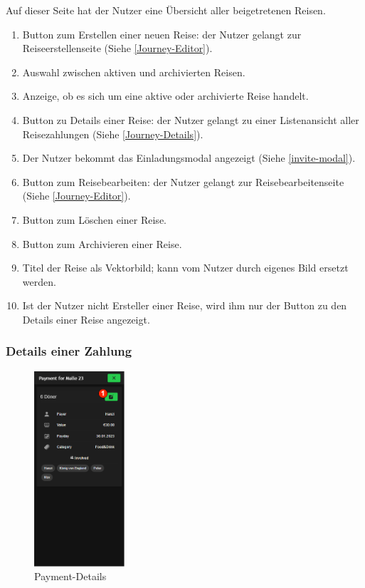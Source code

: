 Auf dieser Seite hat der Nutzer eine Übersicht aller beigetretenen Reisen.

\begin{enumerate}[label=\protect\circled{\arabic*}]
	\item Button zum Erstellen einer neuen Reise: der Nutzer gelangt zur Reiseerstellenseite  (Siehe \ref{Journey-Editor}).
	\item Auswahl zwischen aktiven und archivierten Reisen.
	\item Anzeige, ob es sich um eine aktive oder archivierte Reise handelt.
	\item Button zu Details einer Reise: der Nutzer gelangt zu einer Listenansicht aller Reisezahlungen  (Siehe \ref{Journey-Details}).
	\item Der Nutzer bekommt das Einladungsmodal angezeigt (Siehe \ref{invite-modal}).
	\item Button zum Reisebearbeiten: der Nutzer gelangt zur Reisebearbeitenseite (Siehe \ref{Journey-Editor}).
	\item Button zum Löschen einer Reise.
	\item Button zum Archivieren einer Reise.
	\item Titel der Reise als Vektorbild; kann vom Nutzer durch eigenes Bild ersetzt werden.
	\item Ist der Nutzer nicht Ersteller einer Reise, wird ihm nur der Button zu den Details einer Reise angezeigt.
\end{enumerate}

\subsubsection{Details einer Zahlung}\label{payment-details}
\begin{figure}[H]
	\centering
	\includegraphics[width=0.3\textwidth]{img/pages_numbers/payment-details.drawio}
	\caption[Payment-Details]{Payment-Details}
	\label{fig:payment-details}
\end{figure}

